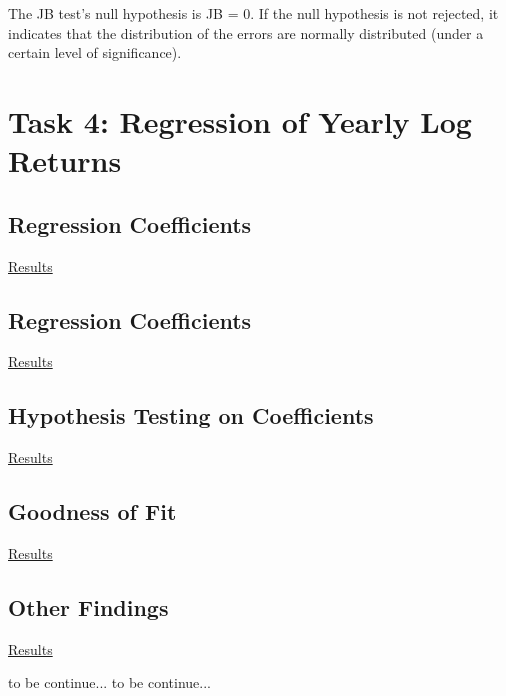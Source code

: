 \documentclass[a4paper]{article}
\begin{document}
	The JB test's null hypothesis is JB = 0. If the null hypothesis is not rejected, it indicates that the
	distribution of the errors are normally distributed (under a certain level of significance).
	
	\section*{Task 4: Regression of Yearly Log Returns}
	\label{sec:num2}
	
	\subsection{Regression Coefficients}
	\underline{Results}
	
	\subsection{Regression Coefficients}
	\underline{Results}
	
	\subsection{Hypothesis Testing on Coefficients}
	\underline{Results}
	
	
	\subsection{Goodness of Fit}
	\underline{Results}
	
	\subsection{Other Findings}
	\underline{Results}
	
	to be continue...
	to be continue...
	
\end{document}
